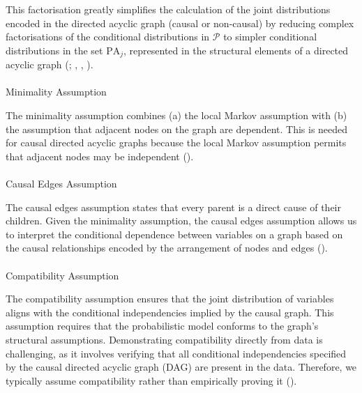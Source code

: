 \documentclass[
  single column]{article}
\makeatletter
\let\oldparagraph\paragraph
\renewcommand{\paragraph}{
    \@ifstar
      \xxxParagraphStar
      \xxxParagraphNoStar
  }
\newcommand{\xxxParagraphStar}[1]{\oldparagraph*{#1}\mbox{}}
\newcommand{\xxxParagraphNoStar}[1]{\oldparagraph{#1}\mbox{}}
\makeatother
\begin{document}
This factorisation greatly simplifies the calculation of the joint
distributions encoded in the directed acyclic graph (causal or
non-causal) by reducing complex factorisations of the conditional
distributions in \(\mathcal{P}\) to simpler conditional distributions in
the set \(\text{PA}_j\), represented in the structural elements of a
directed acyclic graph (; ,
, ).

\paragraph{Minimality Assumption}\label{minimality-assumption}

The minimality assumption combines (a) the local Markov assumption with
(b) the assumption that adjacent nodes on the graph are dependent. This
is needed for causal directed acyclic graphs because the local Markov
assumption permits that adjacent nodes may be independent
().

\paragraph{Causal Edges Assumption}\label{causal-edges-assumption}

The causal edges assumption states that every parent is a direct cause
of their children. Given the minimality assumption, the causal edges
assumption allows us to interpret the conditional dependence between
variables on a graph based on the causal relationships encoded by the
arrangement of nodes and edges
().

\paragraph{Compatibility Assumption}\label{compatibility-assumption}

The compatibility assumption ensures that the joint distribution of
variables aligns with the conditional independencies implied by the
causal graph. This assumption requires that the probabilistic model
conforms to the graph's structural assumptions. Demonstrating
compatibility directly from data is challenging, as it involves
verifying that all conditional independencies specified by the causal
directed acyclic graph (DAG) are present in the data. Therefore, we
typically assume compatibility rather than empirically proving it
().
\end{document}

